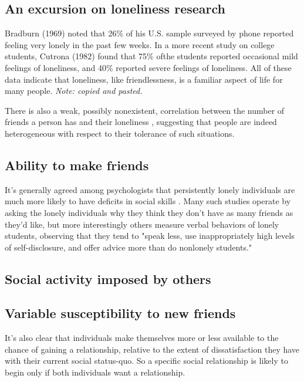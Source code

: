 \documentclass[]{article}
\begin{document}
	\subsection{An excursion on loneliness research}
	Bradburn (1969) noted that 26\% of his
	U.S. sample surveyed by phone reported feeling very lonely in the past few
	weeks. In a more recent study on college students, Cutrona (1982) found that
	75\% ofthe students reported occasional mild feelings of loneliness, and 40\%
	reported severe feelings of loneliness. All of these data indicate that
	loneliness, like friendlessness, is a familiar aspect of life for many people. \cite{Derlega1986} \textit{Note: copied and pasted.}
	
	There is also a weak, possibly nonexistent, correlation between the number of friends a person has and their loneliness \cite[p.~229]{Derlega1986}, suggesting that people are indeed heterogeneous with respect to their tolerance of such situations.
	
	\subsection{Ability to make friends}
	It's generally agreed among psychologists that persistently lonely individuals are much more likely to have deficits in social skills \cite{Wittenberg1986} \cite[p.~232]{Derlega1986}. Many such studies operate by asking the lonely individuals why they think they don't have as many friends as they'd like, but more interestingly others measure verbal behaviors of lonely students, observing that they tend to "speak less, use inappropriately high levels of self-disclosure, and offer advice more than do nonlonely students." \cite[p.~232]{Derlega1986}
	
	\subsection{Social activity imposed by others}
	
	\subsection{Variable susceptibility to new friends}
	It's also clear that individuals make themselves more or less available to the chance of gaining a relationship, relative to the extent of dissatisfaction they have with their current social status-quo. So a specific social relationship is likely to begin only if both individuals want a relationship.
	
\end{document}
